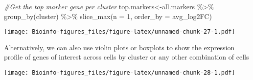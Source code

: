 \documentclass[
  openany]{book}
\newenvironment{Shaded}{\begin{snugshade}}{\end{snugshade}}
\newcommand{\AttributeTok}[1]{\textcolor[rgb]{0.77,0.63,0.00}{#1}}
\newcommand{\CommentTok}[1]{\textcolor[rgb]{0.56,0.35,0.01}{\textit{#1}}}
\newcommand{\DecValTok}[1]{\textcolor[rgb]{0.00,0.00,0.81}{#1}}
\newcommand{\FunctionTok}[1]{\textcolor[rgb]{0.00,0.00,0.00}{#1}}
\newcommand{\NormalTok}[1]{#1}
\newcommand{\OtherTok}[1]{\textcolor[rgb]{0.56,0.35,0.01}{#1}}
\newcommand{\SpecialCharTok}[1]{\textcolor[rgb]{0.00,0.00,0.00}{#1}}
\newcommand{\StringTok}[1]{\textcolor[rgb]{0.31,0.60,0.02}{#1}}
\begin{document}
\begin{Shaded}
\begin{Highlighting}[]
\CommentTok{\#Get the top marker gene per cluster}
\NormalTok{top.markers}\OtherTok{\textless{}{-}}\NormalTok{all.markers }\SpecialCharTok{\%\textgreater{}\%}
    \FunctionTok{group\_by}\NormalTok{(cluster) }\SpecialCharTok{\%\textgreater{}\%}
    \FunctionTok{slice\_max}\NormalTok{(}\AttributeTok{n =} \DecValTok{1}\NormalTok{, }\AttributeTok{order\_by =}\NormalTok{ avg\_log2FC)}
\end{Highlighting}
\end{Shaded}

\begin{Shaded}
\end{Shaded}

\texttt{[image: Bioinfo-figures\_files/figure-latex/unnamed-chunk-27-1.pdf]}

Alternatively, we can also use violin plots or boxplots to show the expression profile of genes of interest across cells by cluster or any other combination of cells

\begin{Shaded}
\end{Shaded}

\texttt{[image: Bioinfo-figures\_files/figure-latex/unnamed-chunk-28-1.pdf]}
\end{document}
